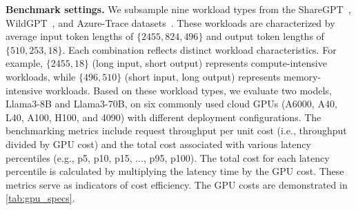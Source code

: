 

\textbf{Benchmark settings.} We subsample nine workload types from the ShareGPT~\cite{zheng2023lmsys}, WildGPT~\cite{zhao2024wildchat}, and Azure-Trace datasets~\cite{patel2024splitwise}. These workloads are characterized by average input token lengths of $\{2455, 824, 496\}$ and output token lengths of $\{510, 253, 18\}$. Each combination reflects distinct workload characteristics. For example, $\{2455, 18\}$ (long input, short output) represents compute-intensive workloads, while $\{496, 510\}$ (short input, long output) represents memory-intensive workloads. Based on these workload types, we evaluate two models, Llama3-8B and Llama3-70B, on six commonly used cloud GPUs (A6000, A40, L40, A100, H100, and 4090) with different deployment configurations. The benchmarking metrics include request throughput per unit cost (i.e., throughput divided by GPU cost) and the total cost associated with various latency percentiles (e.g., p5, p10, p15, $\dots$, p95, p100). The total cost for each latency percentile is calculated by multiplying the latency time by the GPU cost. These metrics serve as indicators of cost efficiency. The GPU costs are demonstrated in \autoref{tab:gpu_specs}.



